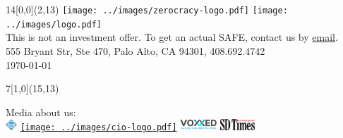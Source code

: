 \documentclass{deck}
\begin{document}
\setlength{\fboxsep}{2pt}
\newcommand\point[2]{\vbox{\raggedright\small%
  \fcolorbox{zgreen}{white}{\color{zgreen}#1}\newline%
  \footnotesize#2\vspace{16pt}}}
\newcommand\highlight[1]{{\color{white}{\hl{\thinspace#1\thinspace}}}}

\begin{textblock}{14}[0,0](2,13){
  \color{gray}\footnotesize
  \texttt{[image: ../images/zerocracy-logo.pdf]}
  \texttt{[image: ../images/logo.pdf]}\\
  This is not an investment offer. To get an actual SAFE,
  contact us by \href{mailto:cio@zerocracy.com}{email}.\\
  555 Bryant Str, Ste 470, Palo Alto, CA 94301, 408.692.4742\\
  \today\quad\zoldversion
}\end{textblock}

\begin{textblock}{7}[1,0](15,13){\begin{flushright}
  \color{gray}\footnotesize
  Media about us:\\[4pt]
  \href{https://cacm.acm.org/blogs/blog-cacm/236106-blockchain-was-the-first-but-will-not-be-the-last/fulltext}{\includegraphics[height=12pt]{../images/acm.pdf}}
  \quad
  \href{https://www.cio.com/article/3326560/artificial-intelligence/workplace-ai-emerging-technologies-ethical-questions.html}{\texttt{[image: ../images/cio-logo.pdf]}}
  \quad
  \href{https://www.voxxed.com/blog/2016/02/xdsd-new-development-methodology-generation-freelance/}{\includegraphics[height=12pt]{../images/voxxed-logo.png}}
  \quad
  \href{http://sdtimes.com/xdsd-looks-to-manage-freelance-programmers/}{\includegraphics[height=12pt]{../images/sdtimes-logo.png}}
\end{flushright}}\end{textblock}
\end{document}
